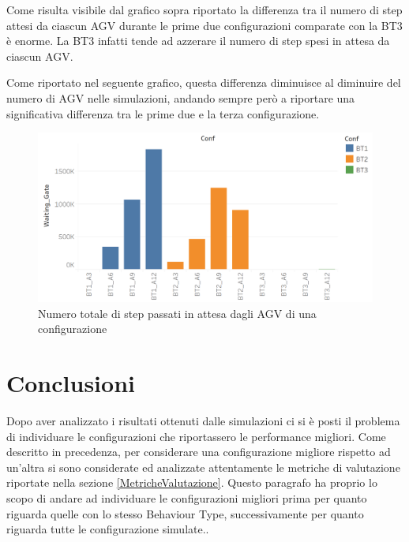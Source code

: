 \documentclass[12pt]{article}
\begin{document}
\noindent Come risulta visibile dal grafico sopra riportato la differenza tra il numero di step attesi da ciascun AGV durante le prime due configurazioni comparate con la BT3 è enorme. La BT3 infatti tende ad azzerare il numero di step spesi in attesa da ciascun AGV.

\newpage 

\noindent Come riportato nel seguente grafico, questa differenza diminuisce al diminuire del numero di AGV nelle simulazioni, andando sempre però a riportare una significativa differenza tra le prime due e la terza configurazione.

\begin{figure}[H]
\centering
  \includegraphics[width=1\linewidth]{Figures/Results_Graphics/Waiting_Total.png}
  \caption{Numero totale di step passati in attesa dagli AGV di una configurazione}\label{fig:waiting_total}
\end{figure}


\newpage
\section{Conclusioni}
Dopo aver analizzato i risultati ottenuti dalle simulazioni ci si è posti il problema di individuare le configurazioni che riportassero le performance migliori. Come descritto in precedenza, per considerare una configurazione migliore rispetto ad un'altra si sono considerate ed analizzate attentamente le metriche di valutazione riportate nella sezione \ref{MetricheValutazione}. Questo paragrafo ha proprio lo scopo di andare ad individuare le configurazioni migliori prima per quanto riguarda quelle con lo stesso Behaviour Type, successivamente per quanto riguarda tutte le configurazione simulate..
\end{document}
